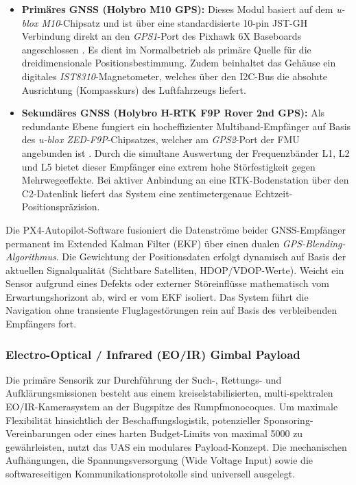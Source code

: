\begin{itemize}
    \item \textbf{Primäres GNSS (Holybro M10 GPS):} Dieses Modul basiert auf dem \textit{u-blox M10}-Chipsatz und ist über eine standardisierte 10-pin JST-GH Verbindung direkt an den \textit{GPS1}-Port 
                                                    des Pixhawk 6X Baseboards angeschlossen \cite{holybro_m10_gps}. Es dient im Normalbetrieb als primäre Quelle für die dreidimensionale Positionsbestimmung. 
                                                    Zudem beinhaltet das Gehäuse ein digitales \textit{IST8310}-Magnetometer, welches über den I2C-Bus die absolute Ausrichtung (Kompasskurs) des Luftfahrzeugs liefert.
    \item \textbf{Sekundäres GNSS (Holybro H-RTK F9P Rover 2nd GPS):} Als redundante Ebene fungiert ein hocheffizienter Multiband-Empfänger auf Basis des \textit{u-blox ZED-F9P}-Chipsatzes, welcher am \textit{GPS2}-Port der FMU angebunden ist 
                                                                      \cite{holybro_hrtk_f9p}. Durch die simultane Auswertung der Frequenzbänder L1, L2 und L5 bietet dieser Empfänger eine extrem hohe Störfestigkeit gegen Mehrwegeeffekte. 
                                                                      Bei aktiver Anbindung an eine RTK-Bodenstation über den C2-Datenlink liefert das System eine zentimetergenaue Echtzeit-Positionspräzision.
\end{itemize}

Die PX4-Autopilot-Software fusioniert die Datenströme beider GNSS-Empfänger permanent im Extended Kalman Filter (EKF) über einen dualen \textit{GPS-Blending-Algorithmus}. 
Die Gewichtung der Positionsdaten erfolgt dynamisch auf Basis der aktuellen Signalqualität (Sichtbare Satelliten, HDOP/VDOP-Werte). Weicht ein Sensor aufgrund eines Defekts oder externer Störeinflüsse mathematisch vom Erwartungshorizont ab, 
wird er vom EKF isoliert. Das System führt die Navigation ohne transiente Fluglagestörungen rein auf Basis des verbleibenden Empfängers fort.

\subsubsection{Electro-Optical / Infrared (EO/IR) Gimbal Payload}
\label{sec:eo_ir_gimbal_payload}

Die primäre Sensorik zur Durchführung der Such-, Rettungs- und Aufklärungsmissionen besteht aus einem kreiselstabilisierten, multi-spektralen EO/IR-Kamerasystem an der Bugspitze des Rumpfmonocoques. 
Um maximale Flexibilität hinsichtlich der Beschaffungslogistik, potenzieller Sponsoring-Vereinbarungen oder eines harten Budget-Limits von maximal \SI{5000}{} zu gewährleisten, nutzt das UAS ein modulares Payload-Konzept. 
Die mechanischen Aufhängungen, die Spannungsversorgung (Wide Voltage Input) sowie die softwareseitigen Kommunikationsprotokolle sind universell ausgelegt. 

